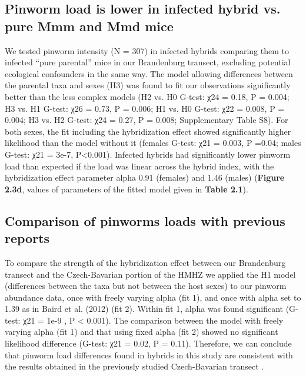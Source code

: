\subsection{Pinworm load is lower in infected hybrid vs. pure Mmm and Mmd mice} 
We tested pinworm intensity (N = 307) in infected hybrids comparing them to infected “pure parental” mice in our Brandenburg transect, excluding potential ecological confounders in the same way. The model allowing differences between the parental taxa and sexes (H3) was found to fit our observations significantly better than the less complex models (H2 vs. H0 G-test: χ24 = 0.18, P = 0.004; H3 vs. H1 G-test: χ26 = 0.73, P = 0.006; H1 vs. H0 G-test: χ22 = 0.008, P = 0.004; H3 vs. H2 G-test: χ24 = 0.27, P = 0.008; Supplementary Table S8). For both sexes, the fit including the hybridization effect showed significantly higher likelihood than the model without it (females G-test: χ21 = 0.003, P =0.04; males G-test: χ21 = 3e-7, P<0.001). Infected hybrids had significantly lower pinworm load than expected if the load was linear across the hybrid index, with the hybridization effect parameter alpha 0.91 (females) and 1.46 (males) (\textbf{Figure 2.3d}, values of parameters of the fitted model given in \textbf{Table 2.1}).

\subsection{Comparison of pinworms loads with previous reports}
To compare the strength of the hybridization effect between our Brandenburg transect and the Czech-Bavarian portion of the HMHZ we applied the H1 model (differences between the taxa but not between the host sexes) to our pinworm abundance data, once with freely varying alpha (fit 1), and once with alpha set to 1.39 as in Baird et al. (2012) (fit 2). Within fit 1, alpha was found significant (G-test: χ21 = 1e-9 , P < 0.001). The comparison between the model with freely varying alpha (fit 1) and that using fixed alpha (fit 2) showed no significant likelihood difference (G-test: χ21 = 0.02, P = 0.11). Therefore, we can conclude that pinworm load differences found in hybrids in this study are consistent with the results obtained in the previously studied Czech-Bavarian transect \citep{baird_where_2012}. 

